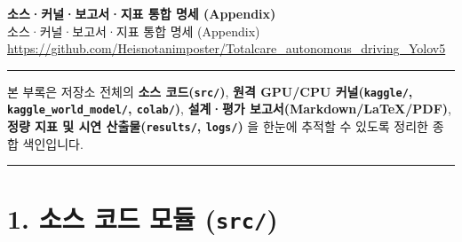 \documentclass[10.5pt,a4paper]{article}
\begin{document}
\begin{center}
{\LARGE\bfseries 소스·커널·보고서·지표 통합 명세 (Appendix)}\\[6pt]
{\normalsize\color{gray} 소스·커널·보고서·지표 통합 명세 (Appendix)}\\[4pt]
{\small\href{https://github.com/Heisnotanimposter/Totalcare_autonomous_driving_Yolov5}{https://github.com/Heisnotanimposter/Totalcare\_autonomous\_driving\_Yolov5}}
\end{center}
\vspace{4pt}
\hrule
\vspace{8pt}

본 부록은 저장소 전체의 \textbf{소스 코드(\texttt{src/\allowbreak{}})}, \textbf{원격 GPU/CPU 커널(\texttt{kaggle/\allowbreak{}}, \texttt{kaggle\_\allowbreak{}world\_\allowbreak{}model/\allowbreak{}}, \texttt{colab/\allowbreak{}})}, \textbf{설계·평가 보고서(Markdown/LaTeX/PDF)}, \textbf{정량 지표 및 시연 산출물(\texttt{results/\allowbreak{}}, \texttt{logs/\allowbreak{}})} 을 한눈에 추적할 수 있도록 정리한 종합 색인입니다.


\par\noindent\rule{\textwidth}{0.4pt}\par\medskip

\section{1. 소스 코드 모듈 (\texttt{src/\allowbreak{}})}
\end{document}
